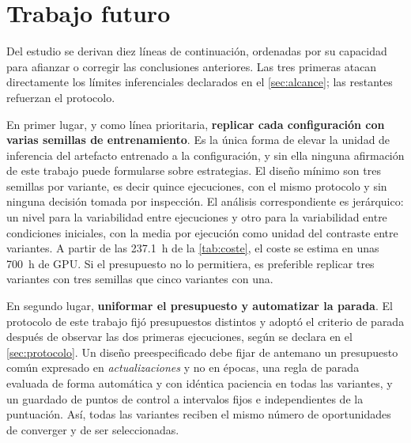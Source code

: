 \section{Trabajo futuro}
\label{sec:trabajo-futuro}

Del estudio se derivan diez l\'ineas de continuaci\'on, ordenadas por su capacidad para
afianzar o corregir las conclusiones anteriores. Las tres primeras atacan directamente los
l\'imites inferenciales declarados en el \cref{sec:alcance}; las restantes refuerzan el
protocolo.

En primer lugar, y como l\'inea prioritaria, \textbf{replicar cada configuraci\'on con
varias semillas de entrenamiento}. Es la \'unica forma de elevar la unidad de inferencia
del artefacto entrenado a la configuraci\'on, y sin ella ninguna afirmaci\'on de este
trabajo puede formularse sobre estrategias. El dise\~no m\'inimo son tres semillas por
variante, es decir quince ejecuciones, con el mismo protocolo y sin ninguna decisi\'on
tomada por inspecci\'on. El an\'alisis correspondiente es jer\'arquico: un nivel para la
variabilidad entre ejecuciones y otro para la variabilidad entre condiciones iniciales,
con la media por ejecuci\'on como unidad del contraste entre variantes. A partir de las
\SI{237.1}{\hour} de la \cref{tab:coste}, el coste se estima en unas \SI{700}{\hour} de
GPU. Si el presupuesto no lo permitiera, es preferible replicar tres variantes con tres
semillas que cinco variantes con una.

En segundo lugar, \textbf{uniformar el presupuesto y automatizar la parada}. El protocolo
de este trabajo fij\'o presupuestos distintos y adopt\'o el criterio de parada despu\'es de
observar las dos primeras ejecuciones, seg\'un se declara en el \cref{sec:protocolo}. Un
dise\~no preespecificado debe fijar de antemano un presupuesto com\'un expresado en
\emph{actualizaciones} y no en \'epocas, una regla de parada evaluada de forma
autom\'atica y con id\'entica paciencia en todas las variantes, y un guardado de puntos de
control a intervalos fijos e independientes de la puntuaci\'on. As\'i, todas las variantes
reciben el mismo n\'umero de oportunidades de converger y de ser seleccionadas.

